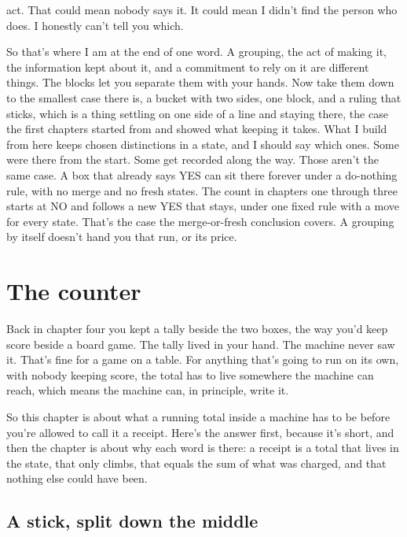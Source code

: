 \documentclass[11pt,twoside]{article}
\theoremstyle{thielethm}
\theoremstyle{thieledef}
\theoremstyle{thieledef}
\theoremstyle{thieledef}
\theoremstyle{thielethm}
\theoremstyle{thieleobs}
\theoremstyle{thielethm}
\begin{document}
act. That could mean nobody says it. It could mean I didn't find the person who does. I honestly can't tell you which.

So that's where I am at the end of one word. A grouping, the act of making it, the information kept about it, and a commitment to rely on it are different things. The blocks let you separate them with your hands. Now take them down to the smallest case there is, a bucket with two sides, one block, and a ruling that sticks, which is a thing settling on one side of a line and staying there, the case the first chapters started from and showed what keeping it takes. What I build from here keeps chosen distinctions in a state, and I should say which ones. Some were there from the start. Some get recorded along the way. Those aren't the same case. A box that already says YES can sit there forever under a do-nothing rule, with no merge and no fresh states. The count in chapters one through three starts at NO and follows a new YES that stays, under one fixed rule with a move for every state. That's the case the merge-or-fresh conclusion covers. A grouping by itself doesn't hand you that run, or its price.

\section{The counter}
\label{sec:counter}

Back in chapter four you kept a tally beside the two boxes, the way you'd keep score beside a board game. The tally lived in your hand. The machine never saw it. That's fine for a game on a table. For anything that's going to run on its own, with nobody keeping score, the total has to live somewhere the machine can reach, which means the machine can, in principle, write it.

So this chapter is about what a running total inside a machine has to be before you're allowed to call it a receipt. Here's the answer first, because it's short, and then the chapter is about why each word is there: a receipt is a total that lives in the state, that only climbs, that equals the sum of what was charged, and that nothing else could have been.

\subsection{A stick, split down the middle}
\end{document}
